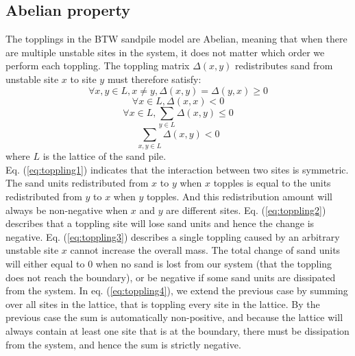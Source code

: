 \subsection{Abelian property}\label{subsec:abelian}

The topplings in the BTW sandpile model are Abelian, meaning that when there are multiple unstable sites in the system, it does not matter which order we perform each toppling. The toppling matrix $\Delta(x,y)$ redistributes sand from unstable site $x$ to site $y$ must therefore satisfy:
\begin{equation}\label{eq:toppling1}
\forall x,y \in L, x \neq y, \Delta(x,y)=\Delta(y,x)\geq 0
\end{equation}
\begin{equation}\label{eq:toppling2}
\forall x \in L, \Delta(x,x)< 0
\end{equation}
\begin{equation}\label{eq:toppling3}
\forall x \in L, \sum_{y\in L}\Delta(x,y)\leq 0
\end{equation}
\begin{equation}\label{eq:toppling4}
\sum_{x,y\in L}\Delta(x,y)< 0
\end{equation}
where $L$ is the lattice of the sand pile.\\

Eq. (\ref{eq:toppling1}) indicates that the interaction between two sites is symmetric. The sand units redistributed from $x$ to $y$ when $x$ topples is equal to the units redistributed from $y$ to $x$ when $y$ topples. And this redistribution amount will always be non-negative when $x$ and $y$ are different sites. Eq. (\ref{eq:toppling2}) describes that a toppling site will lose sand units and hence the change is negative. Eq. (\ref{eq:toppling3}) describes a single toppling caused by an arbitrary unstable site $x$ cannot increase the overall mass. The total change of sand units will either equal to 0 when no sand is lost from our system (that the toppling does not reach the boundary), or be negative if some sand units are dissipated from the system. In eq. (\ref{eq:toppling4}), we extend the previous case by summing over all sites in the lattice, that is toppling every site in the lattice. By the previous case the sum is automatically non-positive, and because the lattice will always contain at least one site that is at the boundary, there must be dissipation from the system, and hence the sum is strictly negative.\\

